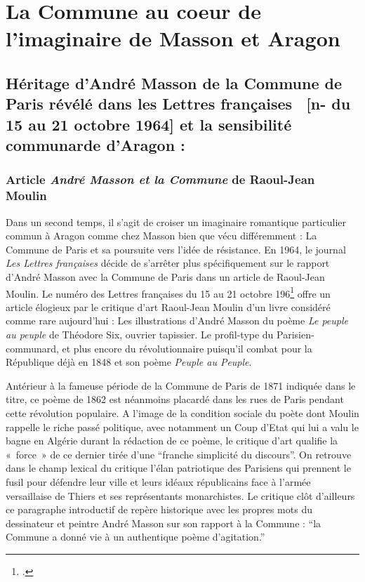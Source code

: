 \chapter{La Commune au coeur de l'imaginaire de Masson et Aragon}

\section{Héritage d’André Masson de la Commune de Paris révélé dans les Lettres françaises  [n- du 15 au 21 octobre 1964] et la sensibilité communarde d’Aragon :}

\subsection{Article \emph{André Masson et la Commune} de Raoul-Jean Moulin }

Dans un second temps, il s’agit de croiser un imaginaire romantique particulier commun à Aragon comme chez Masson bien que vécu différemment : La Commune de Paris et sa poursuite vers l’idée de résistance. En 1964, le journal \emph{Les Lettres françaises} décide de s’arrêter plus spécifiquement sur le rapport d’André Masson avec la Commune de Paris dans un article de Raoul-Jean Moulin. Le numéro des Lettres françaises du 15 au 21 octobre 196\footcite{commune} offre un article élogieux par le critique d’art Raoul-Jean Moulin d’un livre considéré comme rare aujourd’hui : Les illustrations d’André Masson du poème \emph{Le peuple au peuple} de Théodore Six, ouvrier tapissier. Le profil-type du Parisien- communard, et plus encore du révolutionnaire puisqu’il combat pour la République déjà en 1848 et son poème \emph{Peuple au Peuple}. 


 Antérieur à la fameuse période de la Commune de Paris de 1871 indiquée dans le titre, ce poème de 1862 est néanmoins placardé dans les rues de Paris pendant cette révolution populaire. A l’image de la condition sociale du poète dont Moulin rappelle le riche passé politique, avec notamment un Coup d’Etat qui lui a valu le bagne en Algérie durant la rédaction de ce poème, le critique d’art qualifie la « force » de ce dernier tirée d’une \enquote{franche simplicité du discours}. On retrouve dans le champ lexical du critique l’élan patriotique des Parisiens qui prennent le fusil pour défendre leur ville et leurs idéaux républicains face à l’armée versaillaise de Thiers et ses représentants monarchistes. Le critique clôt d’ailleurs ce paragraphe introductif de repère historique avec les propres mots du dessinateur et peintre André Masson sur son rapport à la Commune : \enquote{la Commune a donné vie à un authentique poème d’agitation.}

